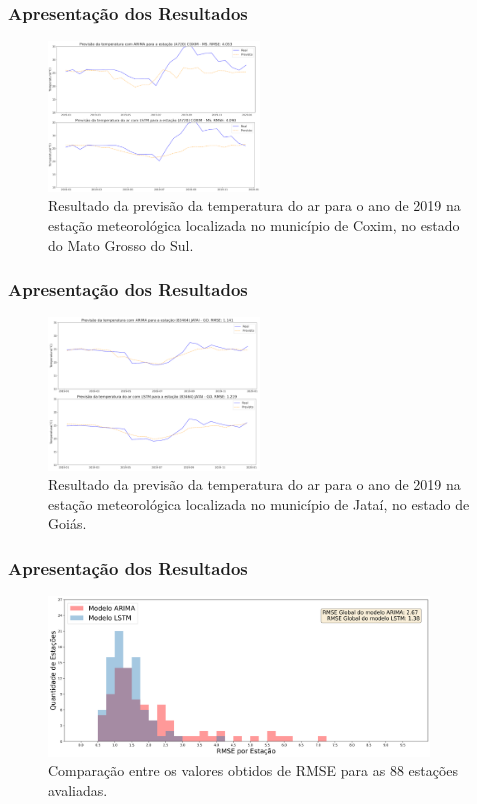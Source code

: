 \documentclass[aspectratio=169]{beamer}
\begin{document}
\begin{frame}
\frametitle{Apresentação dos Resultados}

\begin{figure}[H]
\centering
\caption{Resultado da previsão da temperatura do ar para o ano de 2019 na estação meteorológica localizada no município de Coxim, no estado do Mato Grosso do Sul.}
\includegraphics[width=0.5\textwidth]{figuras/resultados_2.png}
\end{figure}

\end{frame}


\begin{frame}
\frametitle{Apresentação dos Resultados}

\begin{figure}[H]
\centering
\caption{Resultado da previsão da temperatura do ar para o ano de 2019 na estação meteorológica localizada no município de Jataí, no estado de Goiás.}
\includegraphics[width=0.5\textwidth]{figuras/resultados_3.png}
\end{figure}

\end{frame}

\begin{frame}
\frametitle{Apresentação dos Resultados}

\begin{figure}[H]
\centering
\caption{Comparação entre os valores obtidos de RMSE para as 88 estações avaliadas.}
\includegraphics[width=0.9\textwidth]{figuras/comparacao_rmse_arima_lstm_histograma.png}
\end{figure}

\end{frame}
\end{document}
